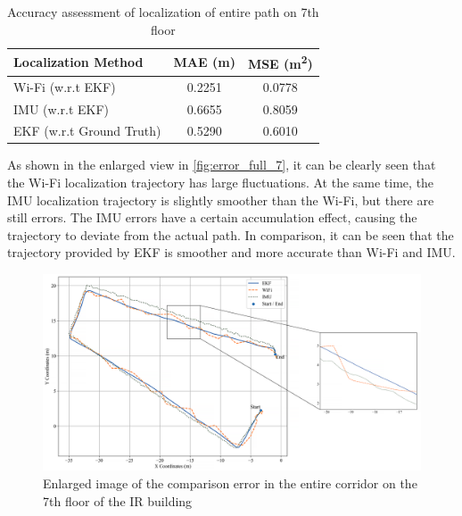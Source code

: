 \documentclass[12pt,a4paper]{article}
\numberwithin{equation}{section}
\begin{document}
\begin{table}[H]
\centering
\caption{Accuracy assessment of localization of entire path on 7th floor}
\label{tab:localization_error}
\begin{tabular}{lcc}
\toprule
\textbf{Localization Method} & \textbf{MAE (m)} & \textbf{MSE (m\textsuperscript{2})} \\
\midrule
Wi-Fi (w.r.t EKF) & 0.2251 & 0.0778 \\
IMU (w.r.t EKF)   & 0.6655 & 0.8059 \\
EKF (w.r.t Ground Truth)    & 0.5290 & 0.6010 \\
\bottomrule
\end{tabular}
\end{table}
\noindent As shown in the enlarged view in \autoref{fig:error_full_7}, it can be clearly seen that the Wi-Fi localization trajectory has large fluctuations. At the same time, the IMU localization trajectory is slightly smoother than the Wi-Fi, but there are still errors. The IMU errors have a certain accumulation effect, causing the trajectory to deviate from the actual path. In comparison, it can be seen that the trajectory provided by EKF is smoother and more accurate than Wi-Fi and IMU.
\begin{figure}[H]
    \centering
    \includegraphics[width=1.1\linewidth]{Amplification images/wifi/full_circle.png}
    \caption{Enlarged image of the comparison error in the entire corridor on the 7th floor of the IR building}
    \label{fig:error_full_7}
\end{figure}
\end{document}
